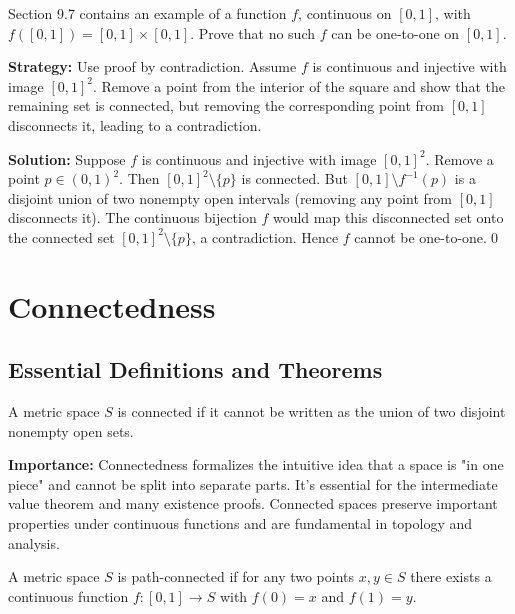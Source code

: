 \begin{problembox}
\begin{problemstatement}
Section 9.7 contains an example of a function $f$, continuous on $[0, 1]$, with $f([0, 1]) = [0, 1] \times [0, 1]$. Prove that no such $f$ can be one-to-one on $[0, 1]$.
\end{problemstatement}
\end{problembox}

\noindent\textbf{Strategy:} Use proof by contradiction. Assume $f$ is continuous and injective with image $[0,1]^2$. Remove a point from the interior of the square and show that the remaining set is connected, but removing the corresponding point from $[0,1]$ disconnects it, leading to a contradiction.

\bigskip\noindent\textbf{Solution:}
Suppose $f$ is continuous and injective with image $[0,1]^2$. Remove a point $p\in(0,1)^2$. Then $[0,1]^2\setminus\{p\}$ is connected. But $[0,1]\setminus f^{-1}(p)$ is a disjoint union of two nonempty open intervals (removing any point from $[0,1]$ disconnects it). The continuous bijection $f$ would map this disconnected set onto the connected set $[0,1]^2\setminus\{p\}$, a contradiction. Hence $f$ cannot be one-to-one.\qed

\section{Connectedness}

\subsection*{Essential Definitions and Theorems}

\begin{definition}
A metric space $S$ is connected if it cannot be written as the union of two disjoint nonempty open sets.
\end{definition}

\noindent\textbf{Importance:} Connectedness formalizes the intuitive idea that a space is "in one piece" and cannot be split into separate parts. It's essential for the intermediate value theorem and many existence proofs. Connected spaces preserve important properties under continuous functions and are fundamental in topology and analysis.



\begin{definition}
A metric space $S$ is path-connected if for any two points $x,y \in S$ there exists a continuous function $f: [0,1] \to S$ with $f(0) = x$ and $f(1) = y$.
\end{definition}

